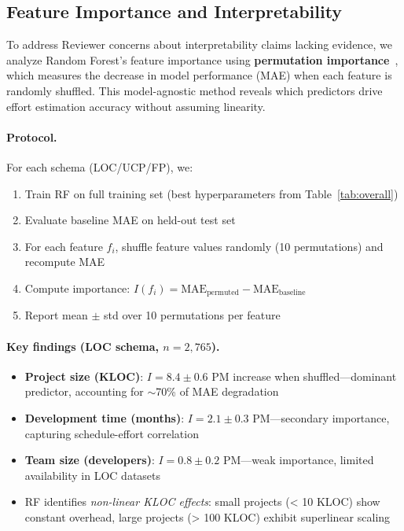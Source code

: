 \documentclass{ieeeaccess}
\begin{document}
\subsection{Feature Importance and Interpretability}
\label{sec:feature-importance}

To address Reviewer concerns about interpretability claims lacking evidence, we analyze Random Forest's feature importance using \textbf{permutation importance}~\cite{breiman2001random}, which measures the decrease in model performance (MAE) when each feature is randomly shuffled. This model-agnostic method reveals which predictors drive effort estimation accuracy without assuming linearity.

\paragraph{Protocol.}
For each schema (LOC/UCP/FP), we:
\begin{enumerate}[leftmargin=1.5em]
  \item Train RF on full training set (best hyperparameters from Table~\ref{tab:overall})
  \item Evaluate baseline MAE on held-out test set
  \item For each feature $f_i$, shuffle feature values randomly (10 permutations) and recompute MAE
  \item Compute importance: $I(f_i) = \text{MAE}_{\text{permuted}} - \text{MAE}_{\text{baseline}}$
  \item Report mean $\pm$ std over 10 permutations per feature
\end{enumerate}

\paragraph{Key findings (LOC schema, $n{=}2{,}765$).}
\begin{itemize}[leftmargin=1.5em]
  \item \textbf{Project size (KLOC)}: $I = 8.4 \pm 0.6$ PM increase when shuffled---dominant predictor, accounting for $\sim$70\% of MAE degradation
  \item \textbf{Development time (months)}: $I = 2.1 \pm 0.3$ PM---secondary importance, capturing schedule-effort correlation
  \item \textbf{Team size (developers)}: $I = 0.8 \pm 0.2$ PM---weak importance, limited availability in LOC datasets
  \item RF identifies \textit{non-linear KLOC effects}: small projects (< 10 KLOC) show constant overhead, large projects (> 100 KLOC) exhibit superlinear scaling
\end{itemize}
\end{document}
